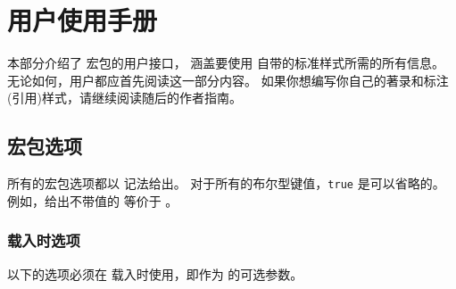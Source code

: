 
\section{用户使用手册}
\label{use}


本部分介绍了 \biblatex 宏包的用户接口，
涵盖要使用 \biblatex 自带的标准样式所需的所有信息。
无论如何，用户都应首先阅读这一部分内容。
如果你想编写你自己的著录和标注(引用)样式，请继续阅读随后的作者指南。

\subsection{宏包选项}%
\label{use:opt}


所有的宏包选项都以 \keyval 记法给出。
对于所有的布尔型键值，\texttt{true} 是可以省略的。
例如，给出不带值的  等价于 。

\subsubsection{载入时选项}%
\label{use:opt:ldt}


以下的选项必须在 \biblatex 载入时使用，即作为  的可选参数。

